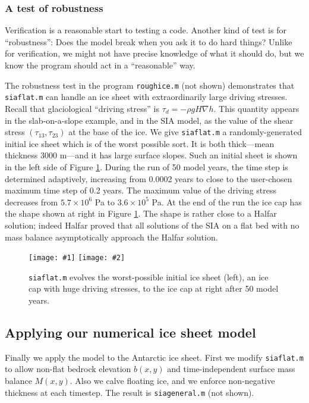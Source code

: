 \documentclass[letterpaper,final,12pt,reqno]{amsart}
\newcommand{\grad}{\nabla}
\newcommand{\twofigsizes}[5]{
\begin{figure}[ht]
\centering
\texttt{[image: \#1]} \quad
\texttt{[image: \#2]}
\caption{#3}
\label{fig:#1}
\end{figure}}
\newcommand{\twofig}[3]{\twofigsizes{#1}{#2}{#3}{2.5in}{2.5in}}
\begin{document}
\subsubsection*{A test of robustness}  Verification is a reasonable start to testing a code.  Another kind of test is for ``robustness'': Does the model break when you ask it to do hard things?  Unlike for verification, we might not have precise knowledge of what it should do, but we know the program should act in a ``reasonable'' way.

The robustness test in the program \texttt{roughice.m} (not shown) demonstrates that \texttt{siaflat.m} can handle an ice sheet with extraordinarily large driving stresses.  Recall that glaciological ``driving stress'' is $\tau_d = - \rho g H \grad h$.  This quantity appears in the slab-on-a-slope example, and in the SIA model, as the value of the shear stress $(\tau_{13},\tau_{23})$ at the base of the ice.  We give \texttt{siaflat.m} a randomly-generated initial ice sheet which is of the worst possible sort.  It is both thick---mean thickness 3000 m---and it has large surface slopes.  Such an initial sheet is shown in the left side of Figure \ref{fig:roughinitial}.  During the run of 50 model years, the time step is determined adaptively, increasing from 0.0002 years to close to the user-chosen maximum time step of 0.2 years.  The maximum value of the driving stress decreases from $5.7\times 10^6$ Pa to $3.6\times 10^5$ Pa.  At the end of the run the ice cap has the shape shown at right in Figure \ref{fig:roughinitial}.  The shape is rather close to a Halfar solution; indeed Halfar proved that all solutions of the SIA on a flat bed with no mass balance asymptotically approach the Halfar solution.

\twofig{roughinitial}{roughfinal}{\texttt{siaflat.m} evolves the worst-possible initial ice sheet (left), an ice cap with huge driving stresses, to the ice cap at right after 50 model years.}


\subsection{Applying our numerical ice sheet model}

Finally we apply the model to the Antarctic ice sheet.  First we modify \texttt{siaflat.m} to allow non-flat bedrock elevation $b(x,y)$ and time-independent surface mass balance $M(x,y)$.  Also we calve floating ice, and we enforce non-negative thickness at each timestep.  The result is \texttt{siageneral.m} (not shown).
\end{document}
